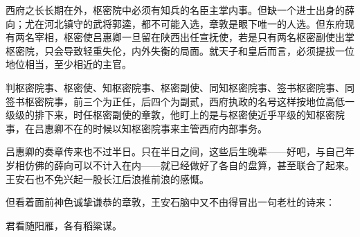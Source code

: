 西府之长长期在外，枢密院中必须有知兵的名臣主掌内事。但缺一个进士出身的薛向；尤在河北镇守的武将郭逵，都不可能入选，章敦是眼下唯一的人选。但东府现有两名宰相，枢密使吕惠卿一旦留在陕西出任宣抚使，若是只有两名枢密副使出掌枢密院，只会导致轻重失伦，内外失衡的局面。就天子和皇后而言，必须提拔一位地位相当，至少相近的主官。

判枢密院事、枢密使、知枢密院事、枢密副使、同知枢密院事、签书枢密院事、同签书枢密院事，前三个为正任，后四个为副贰，西府执政的名号这样按地位高低一级级的排下来，时任枢密副使的章敦，他盯上的是与枢密使近乎平级的知枢密院事，在吕惠卿不在的时候以知枢密院事来主管西府内部事务。

吕惠卿的奏章传来也不过半日。只在半日之间，这些后生晚辈——好吧，与自己年岁相仿佛的薛向可以不计入在内——就已经做好了各自的盘算，甚至联合了起来。王安石也不免兴起一股长江后浪推前浪的感慨。

但看着面前神色诚挚谦恭的章敦，王安石脑中又不由得冒出一句老杜的诗来：

君看随阳雁，各有稻粱谋。

